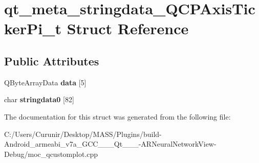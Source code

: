 \hypertarget{structqt__meta__stringdata___q_c_p_axis_ticker_pi__t}{}\section{qt\+\_\+meta\+\_\+stringdata\+\_\+\+Q\+C\+P\+Axis\+Ticker\+Pi\+\_\+t Struct Reference}
\label{structqt__meta__stringdata___q_c_p_axis_ticker_pi__t}
\subsection*{Public Attributes}
\begin{DoxyCompactItemize}
\item 
\mbox{\label{structqt__meta__stringdata___q_c_p_axis_ticker_pi__t_a93e953a290497b91cd46e36f319f6de1}} 
Q\+Byte\+Array\+Data {\bfseries data} \mbox{[}5\mbox{]}
\item 
\mbox{\label{structqt__meta__stringdata___q_c_p_axis_ticker_pi__t_a7dcd9e89f6fc70bd1ea9141571b0a089}} 
char {\bfseries stringdata0} \mbox{[}82\mbox{]}
\end{DoxyCompactItemize}


The documentation for this struct was generated from the following file\+:\begin{DoxyCompactItemize}
\item 
C\+:/\+Users/\+Curunir/\+Desktop/\+M\+A\+S\+S/\+Plugins/build-\/\+Android\+\_\+armeabi\+\_\+v7a\+\_\+\+G\+C\+C\+\_\+\_\+\_\+\+Qt\+\_\+\_\+\_-\/\+A\+R\+Neural\+Network\+View-\/\+Debug/moc\+\_\+qcustomplot.\+cpp\end{DoxyCompactItemize}
